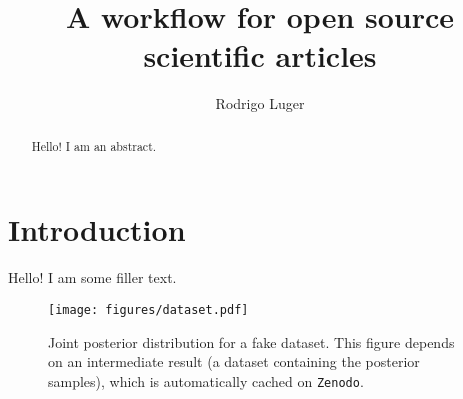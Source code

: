 \documentclass[twocolumn]{aastex631}
\begin{document}
\title{A workflow for open source scientific articles}

\author[0000-0002-0296-3826]{Rodrigo Luger}

\begin{abstract}
    Hello! I am an abstract.
\end{abstract}

\section{Introduction}
\label{sec:intro}

Hello! I am some filler text.

\begin{figure}[ht!]
    \begin{centering}
        \texttt{[image: figures/dataset.pdf]}
        \caption{
            Joint posterior distribution for a fake dataset.
            This figure depends on an intermediate result (a dataset containing the posterior samples), which is automatically cached on \texttt{Zenodo}.
        }
        \label{fig:plot_dataset}
    \end{centering}
\end{figure}
\end{document}
